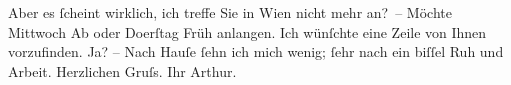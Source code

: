 \pstart
           Aber es{ }ſcheint wirklich, ich treffe Sie in Wien
               nicht mehr an? – Möchte Mittwoch{ }\introOben{}Ab\introOben{} oder Do{\geminationn}erſtag{ }Früh anlangen. Ich wünſchte eine Zeile von Ihnen vorzufinden. Ja? – Nach
               Hauſe{ }ſehn ich mich wenig;{ }ſehr nach ein biſſel Ruh und Arbeit.\pend
           \pstart Herzlichen Gruſs. Ihr \spacefill\mbox{Arthur.}\pend{}\endnumbering{}  \newcommand{\dateiname}{L00681}\newcommand{\titel}{Arthur Schnitzler an Richard Beer-Hofmann, 29. 5. 1897}\newcommand{\editorInnen}{Martin Anton Müller und Gerd-Hermann Susen}
